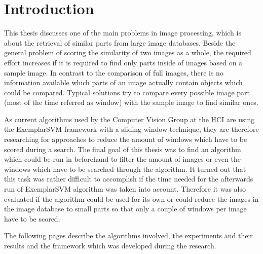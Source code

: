 \chapter{Introduction}


This thesis discusses one of the main problems in image processing, which is about the retrieval of similar parts from large image databases.
Beside the general problem of scoring the similarity of two images as a whole, the required effort increases if it is required to find only parts inside of images based on a sample image. In contrast to the comparison of full images, there is no information available which parts of an image actually contain objects which could be compared.
Typical solutions try to compare every possible image part (most of the time referred as window) with the sample image to find similar ones.
\bigskip

As current algorithms used by the Computer Vision Group at the \ac{HCI} are using the ExemplarSVM \cite{Malisiewicz2011} framework with a sliding window technique, they are therefore researching for approaches to reduce the amount of windows which have to be scored during a search. 
The final goal of this thesis was to find an algorithm which could be run in beforehand to filter the amount of images or even the windows which have to be searched through the algorithm. It turned out that this task was rather difficult to accomplish if the time needed for the afterwards run of ExemplarSVM algorithm was taken into account. Therefore it was also evaluated if the algorithm could be used for its own or could reduce the images in the image database to small parts so that only a couple of windows per image have to be scored.

The following pages describe the algorithms involved, the experiments and their results and the framework which was developed during the research.